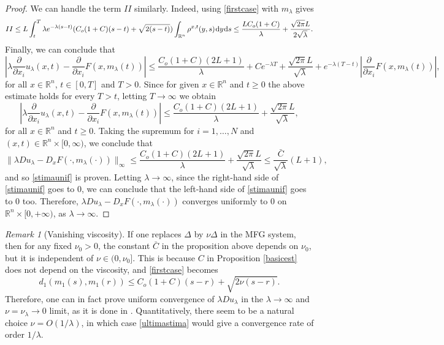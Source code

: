 \documentclass{amsart}
\theoremstyle{remark}
\newtheorem{rem}[thm]{Remark}
\theoremstyle{definition}
\theoremstyle{Claim}
\newcommand{\R}{\mathbb{R}}
\newcommand{\dd}{\hspace{0.7pt}{\rm d}}
\theoremstyle{plain}
\begin{document}
\begin{proof}
	We can handle the term $II$ similarly. Indeed, using \eqref{firstcase} with {$m_\lambda$} gives
	\[
		\displaystyle{II\le L\int_{t}^{T}\lambda e^{-\lambda (s-t)}({C_o(1+C)}(s-t) + \sqrt{2(s-t)})\int_{\R^n}\rho^{x,t}(y,s)\dd y\dd s}%
		\leq \frac{L{C_o(1+C)}}{\lambda}+\frac{\sqrt{2\pi}L}{2\sqrt{\lambda}}.
\]
	Finally, we can conclude that
		\begin{equation}\label{stimaconT}
		\left| \lambda \frac{\partial}{\partial x_i}u_\lambda(x,t)-\frac{\partial}{\partial x_i}F(x,m_\lambda(t))\right| \le \frac{{C_o(1+C)(2L+1)}}{\lambda}+Ce^{-\lambda T}+\frac{\sqrt{2\pi }L}{\sqrt{\lambda}}+e^{-\lambda(T-t)}\left\lvert\frac{\partial}{\partial x_i}F(x,m_\lambda(t))\right\rvert,
		\end{equation}
		for all $x\in \mathbb{R}^n$, $t\in [0,T]$ and $T>0$. Since for given $x\in \mathbb{R}^n$ and $t\geq 0$ the above estimate holds for every $T>t$, letting $T\to \infty$ we obtain
		$$\left| \lambda \frac{\partial}{\partial x_i}u_\lambda(x,t)-\frac{\partial}{\partial x_i}F(x,m_\lambda(t))\right| \le \frac{{C_o(1+C)(2L+1)}}{\lambda}+\frac{\sqrt{2\pi }L}{\sqrt{\lambda}},
		$$
		for all $x\in \mathbb{R}^n$ and $t\geq 0$.
		Taking the supremum for $i=1,\dots,N$ and $(x,t)\in \mathbb{R}^n\times [0,\infty)$, we conclude that
		\begin{equation}\label{ultimastima}
		\| \lambda Du_\lambda-D_x F(\cdot,m_\lambda(\cdot))\|_\infty \le \frac{{C_o(1+C)(2L+1)}}{\lambda}+\frac{\sqrt{2\pi }L}{\sqrt{\lambda}}\leq \frac{\bar{C}}{\sqrt{\lambda}}(L+1),
		\end{equation}
		and so \eqref{stimaunif} is proven. Letting $\lambda\to \infty$, since the right-hand side of  \eqref{stimaunif} goes to 0, we can conclude that the left-hand side of \eqref{stimaunif} goes to 0 too. Therefore, $\lambda Du_\lambda-D_xF(\cdot,m_\lambda(\cdot))$ converges uniformly to $0$ on $\mathbb{R}^n\times [0,+\infty)$, as $\lambda \to \infty$.
		
	\end{proof}
	\begin{rem}[Vanishing viscosity] If one replaces $\Delta$ by $\nu \Delta$ in the MFG system, then for any fixed $\nu_0 > 0$, the constant $\bar C$ in the proposition above depends on $\nu_0$, but it is independent of $\nu \in (0,\nu_0]$. This is because $C$ in Proposition \ref{basicest} does not depend on the viscosity, and \eqref{firstcase} becomes
	\[
	d_1(m_1(s), m_1(r))\le {C_o(1+C)}(s-r) + \sqrt{2\nu(s-r)}.
	\]
	Therefore, one can in fact prove uniform convergence of {$\lambda Du_\lambda$} in the $\lambda \to \infty$ and $\nu = \nu_\lambda \to 0$ limit, as it is done in \cite{BC}. Quantitatively, there seem to be a natural choice $\nu = O(1/\lambda)$, in which case \eqref{ultimastima} would give a convergence rate of order $1/\lambda$.
	\end{rem}
	
\end{document}
